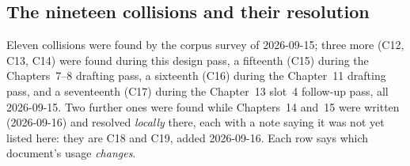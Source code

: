 \subsection{The nineteen collisions and their resolution}\label{sec:notation-collisions}

Eleven collisions were found by the corpus survey of 2026-09-15; three more
(C12, C13, C14) were found during this design pass, a fifteenth (C15) during
the Chapters~7--8 drafting pass, a sixteenth (C16) during the Chapter~11
drafting pass, and a seventeenth (C17) during the Chapter~13 slot~4 follow-up
pass, all 2026-09-15. Two further ones were found while Chapters~14 and~15 were
written (2026-09-16) and resolved \emph{locally} there, each with a note saying it was
not yet listed here: they are C18 and C19, added 2026-09-16. Each
row says which document's usage \emph{changes}.

